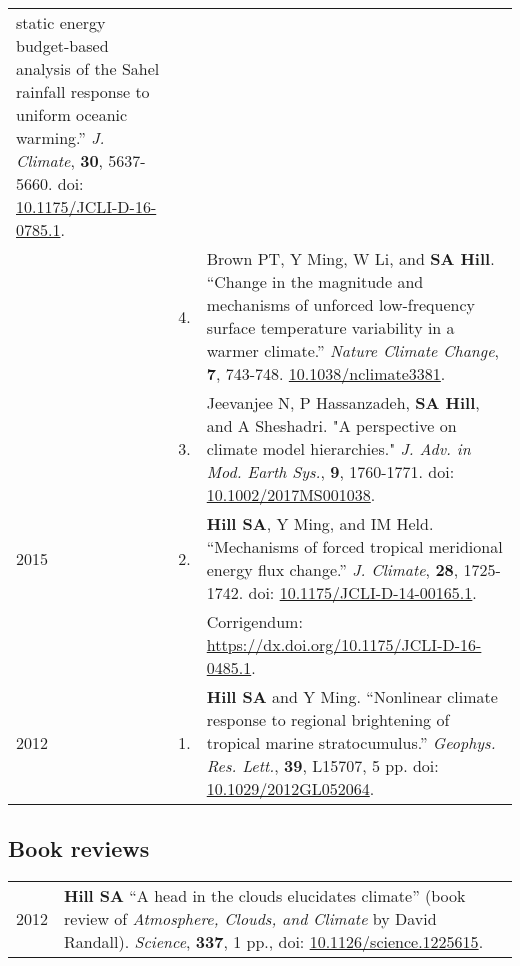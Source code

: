 \documentclass[letterpaper,11pt]{shillcv}
\begin{document}
\begin{longtable}{@{} Y{0.05\textwidth} >{\color{black}} p{0.04\textwidth} @{} L{0.91\textwidth} @{}}
static energy budget-based analysis of the Sahel rainfall response to uniform
oceanic warming.''  \emph{J. Climate}, \textbf{30}, 5637-5660.  doi: \href{https://doi.org/10.1175/JCLI-D-16-0785.1}{10.1175/JCLI-D-16-0785.1}.\\
     & 4. & Brown PT, Y Ming, W Li, and \textbf{SA Hill}.  ``Change
in the magnitude and mechanisms of unforced low-frequency surface temperature
variability in a warmer climate.''  \emph{Nature Climate Change}, \textbf{7}, 743-748.  \href{https://doi.org/10.1038/nclimate3381}{10.1038/nclimate3381}.\\
     & 3. & Jeevanjee N, P Hassanzadeh, \textbf{SA Hill}, and A Sheshadri.  "A perspective on climate model hierarchies."  \emph{J.  Adv. in Mod. Earth Sys.}, \textbf{9}, 1760-1771.  doi: \href{https://doi.org/10.1002/2017MS001038}{10.1002/2017MS001038}.\\
2015 & 2. & \textbf{Hill SA}, Y Ming, and IM Held.  ``Mechanisms of forced
tropical meridional energy flux change.''  \emph{J. Climate}, \textbf{28}, 1725-1742.  doi: \href{http://dx.doi.org/10.1175/JCLI-D-14-00165.1}{10.1175/JCLI-D-14-00165.1}.\\
& & \hspace{1cm} Corrigendum: \href{https://dx.doi.org/10.1175/JCLI-D-16-0485.1}{https://dx.doi.org/10.1175/JCLI-D-16-0485.1}.\\
2012 & 1. & \textbf{Hill SA} and Y Ming.  ``Nonlinear climate response to regional
brightening of tropical marine stratocumulus.''  \emph{Geophys. Res. Lett.},
\textbf{39}, L15707, 5 pp.  doi: \href{http://dx.doi.org/10.1029/2012GL052064}{10.1029/2012GL052064}.\\
\end{longtable}

\subsection*{Book reviews}
\begin{longtable}{@{}  Y{0.05\textwidth} L{0.95\textwidth} @{}}
2012 & \textbf{Hill SA}  ``A head in the clouds elucidates climate'' (book
review of \emph{Atmosphere, Clouds, and Climate} by David Randall).  \emph{Science}, \textbf{337},
1 pp., doi: \href{http://dx.doi.org/10.1126/science.1225615}{10.1126/science.1225615}.\\
\end{longtable}
\end{document}
